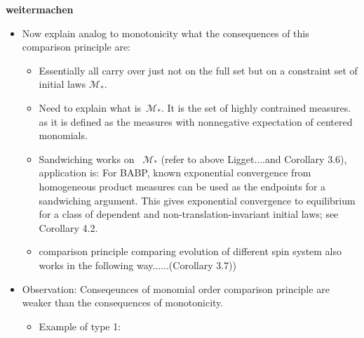  {\color{blue}\textbf{weitermachen}}

{\color{red}
\begin{itemize}
\item Now explain analog to monotonicity what the consequences of this comparison principle are:
  \begin{itemize}
  \item Essentially all carry over just not on the full set but on a constraint set of initial laws $\mathcal{M}_{*}$.
\item Need to explain what is~$\mathcal{M}_{*}$. It is the set of highly contrained measures. as it is defined as the measures with nonnegative expectation of centered monomials. 

\item Sandwiching works on ~$\mathcal{M}_{*}$ (refer to above Ligget....and Corollary 3.6), application is: For BABP, known exponential convergence from homogeneous
product measures can be used as the endpoints for a sandwiching argument. This gives
exponential convergence to equilibrium for a class of dependent and non-translation-invariant
initial laws; see Corollary 4.2.
\item comparison principle comparing evolution of different spin system also works in the following way......(Corollary 3.7))
\end{itemize}
\item Observation: Conseqeunces of monomial order comparison principle are weaker than the consequences of monotonicity.
  \begin{itemize}


  \item Example of type 1:  
  
  
  \end{itemize}
\end{itemize}
}







